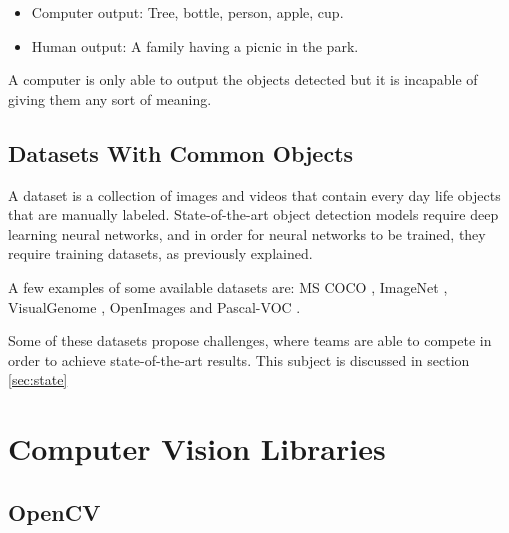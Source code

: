     \begin{itemize}
        
        \item Computer output: Tree, bottle, person, apple, cup.
        \item Human output: A family having a picnic in the park.
    \end{itemize}
     
    \par A computer is only able to output the objects detected but it is incapable of giving them any sort of meaning.




    \subsection{Datasets With Common Objects}

    \label{dataset}

    \par A dataset is a collection of images and videos that contain every day life objects that are manually labeled. State-of-the-art object detection models require deep learning neural networks, and in order for neural networks to be trained, they  require training datasets, as previously explained.  

    \par A few examples of some available datasets are:  MS COCO \cite{Lin2014}, ImageNet \cite{Takamitsu1978} , VisualGenome \cite{Language2015}, OpenImages \cite{Kuznetsova2018} and Pascal-VOC \cite{Everingham2010}.

    \par Some of these datasets propose challenges, where teams are able to compete in order to achieve state-of-the-art results. This subject is discussed in section \ref{sec:state}



\section{Computer Vision Libraries}
\label{sec:libraries_cv}


    \subsection{OpenCV}

